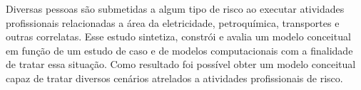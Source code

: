 Diversas pessoas são submetidas a algum tipo de risco ao executar atividades profissionais relacionadas a área da eletricidade, petroquímica, transportes e outras correlatas. Esse estudo sintetiza, constrói e avalia um modelo conceitual em função de um estudo de caso e de modelos computacionais com a finalidade de tratar essa situação. Como resultado foi possível obter um modelo conceitual capaz de tratar diversos cenários atrelados a atividades profissionais de risco. 